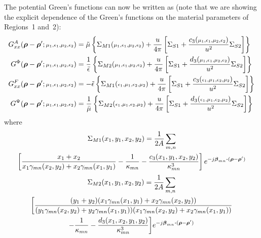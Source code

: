 The potential Green's functions can now be written as (note that we
are showing the explicit dependence of the Green's functions on the
material parameters of Regions~1 and~2):
\begin{subequations}
  \label{eq:gf}
  \begin{align}
    G^A_{xx}(\boldsymbol{\rho}-\boldsymbol{\rho}';{\scriptstyle \mu_1,\epsilon_1,\mu_2,\epsilon_2}) & =
    \tilde{\mu}
    \left\{
      \Sigma_{M1}({\scriptstyle \mu_1,\epsilon_1,\mu_2,\epsilon_2}) + 
      \frac{u}{4\pi}
      \left[
        \Sigma_{S1} + \frac{c_3({\scriptstyle
            \mu_1,\epsilon_1,\mu_2,\epsilon_2})}{u^2} \Sigma_{S2}
        \right]
    \right\} 
  \\
  G^\Phi(\boldsymbol{\rho}-\boldsymbol{\rho}';{\scriptstyle \mu_1,\epsilon_1,\mu_2,\epsilon_2}) &= 
  \frac{1}{\bar{\epsilon}}
  \left\{
    \Sigma_{M2}({\scriptstyle \mu_1,\epsilon_1,\mu_2,\epsilon_2}) + 
    \frac{u}{4\pi}
    \left[
        \Sigma_{S1} + \frac{d_3({\scriptstyle
            \mu_1,\epsilon_1,\mu_2,\epsilon_2})}{u^2} \Sigma_{S2}
        \right]
    \right\} 
  \\
  G^F_{xx}(\boldsymbol{\rho}-\boldsymbol{\rho}';{\scriptstyle \mu_1,\epsilon_1,\mu_2,\epsilon_2}) & = 
  -\tilde{\epsilon} 
  \left\{
    \Sigma_{M1}({\scriptstyle \epsilon_1,\mu_1,\epsilon_2,\mu_2}) + 
      \frac{u}{4\pi}
      \left[
        \Sigma_{S1} + \frac{c_3({\scriptstyle
            \epsilon_1,\mu_1,\epsilon_2,\mu_2})}{u^2} \Sigma_{S2}
        \right]
    \right\} 
  \\
  G^\Psi(\boldsymbol{\rho}-\boldsymbol{\rho}';{\scriptstyle \mu_1,\epsilon_1,\mu_2,\epsilon_2}) &= 
  \frac{1}{\bar{\mu}}
  \left\{
    \Sigma_{M2}({\scriptstyle \epsilon_1,\mu_1,\epsilon_2,\mu_2}) + 
    \frac{u}{4\pi}
    \left[
        \Sigma_{S1} + \frac{d_3({\scriptstyle
            \epsilon_1,\mu_1,\epsilon_2,\mu_2})}{u^2} \Sigma_{S2}
        \right]
    \right\} 
  \end{align}
\end{subequations}
where
\begin{multline}
  \Sigma_{M1}(x_1,y_1,x_2,y_2)  = 
  \frac{1}{2A} 
  \sum_{m,n} \\
  \left[
    \frac{x_1+x_2}{x_1\gamma_{mn}(x_2,y_2) + x_2\gamma_{mn}(x_1,y_1)}
    -\frac{1}{\kappa_{mn}} - \frac{c_3(x_1,y_1,x_2,y_2)}{\kappa_{mn}^3}
  \right]
  e^{-j\boldsymbol{\beta}_{mn} \boldsymbol{\cdot} (\boldsymbol{\rho}-\boldsymbol{\rho}')}
  \label{eq:sigmam1}
\end{multline}
\begin{multline}
  \Sigma_{M2}(x_1,y_1,x_2,y_2)  =
  \frac{1}{2A} 
  \summn \\
  \biggl[
    \frac{(y_1+y_2)
      (x_1\gamma_{mn}(x_1,y_1) + x_2\gamma_{mn}(x_2,y_2))}%
    {(y_1\gamma_{mn}(x_2,y_2)+y_2\gamma_{mn}(x_1,y_1))
      (x_1\gamma_{mn}(x_2,y_2)+x_2\gamma_{mn}(x_1,y_1)) } \\
    -\frac{1}{\kappa_{mn}} - \frac{d_3(x_1,x_2,y_1,y_2)}{\kappa_{mn}^3}
  \biggr]
  e^{-j\vecbeta_{mn} \bdot (\vecrho-\vecrho')}
  \label{eq:sigmam2}
\end{multline}
